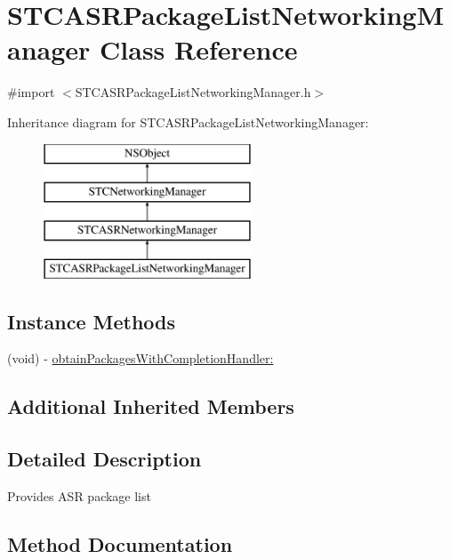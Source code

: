 \hypertarget{interface_s_t_c_a_s_r_package_list_networking_manager}{}\section{S\+T\+C\+A\+S\+R\+Package\+List\+Networking\+Manager Class Reference}
\label{interface_s_t_c_a_s_r_package_list_networking_manager}


{\ttfamily \#import $<$S\+T\+C\+A\+S\+R\+Package\+List\+Networking\+Manager.\+h$>$}

Inheritance diagram for S\+T\+C\+A\+S\+R\+Package\+List\+Networking\+Manager\+:\begin{figure}[H]
\begin{center}
\leavevmode
\includegraphics[height=4.000000cm]{interface_s_t_c_a_s_r_package_list_networking_manager}
\end{center}
\end{figure}
\subsection*{Instance Methods}
\begin{DoxyCompactItemize}
\item 
(void) -\/ \hyperlink{interface_s_t_c_a_s_r_package_list_networking_manager_af8e17a9a8090e6f6f8c95462145d427e}{obtain\+Packages\+With\+Completion\+Handler\+:}
\end{DoxyCompactItemize}
\subsection*{Additional Inherited Members}


\subsection{Detailed Description}
Provides A\+SR package list 

\subsection{Method Documentation}
\hypertarget{interface_s_t_c_a_s_r_package_list_networking_manager_af8e17a9a8090e6f6f8c95462145d427e}{}\label{interface_s_t_c_a_s_r_package_list_networking_manager_af8e17a9a8090e6f6f8c95462145d427e} 
